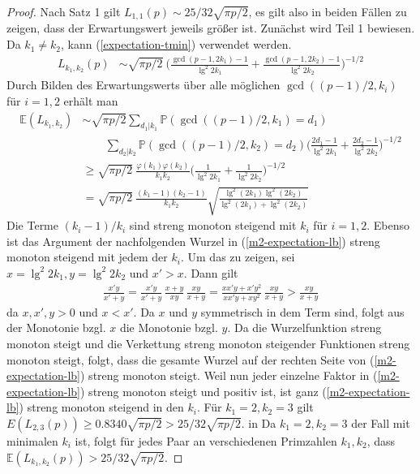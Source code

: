 \documentclass[a4paper, 10pt, ngerman]{article}
\newcommand{\E}{\mathbb{E}}
\renewcommand{\P}{\mathbb{P}}
\begin{document}
\begin{proof}
    Nach Satz 1 gilt $L_{1, 1}(p) \sim 25/32 \sqrt{\pi p /2}$, es gilt also in beiden Fällen zu zeigen, dass der Erwartungswert jeweils größer ist. Zunächst wird Teil 1 bewiesen. Da $k_1 \ne k_2$, kann (\ref{expectation-tmin}) verwendet werden.
    \begin{align*}
        L_{k_1, k_2}(p)
         & \sim \sqrt{\pi p / 2} \
        \Bigg ( \frac {\gcd(p - 1, 2k_1) - 1} {\lg^2 2k_1} +
        \frac {\gcd(p -1, 2k_2) - 1} {\lg^2 2k_2} \Bigg )^{-1/2}
    \end{align*}
    Durch Bilden des Erwartungswerts über alle möglichen $\gcd((p - 1)/2, k_i)$ für $i = 1, 2$ erhält man
    \begin{align}
        \E(L_{k_1, k_2})
         & \sim \sqrt{\pi p / 2}
        \sum_{d_1 | k_1} \P(\gcd((p - 1)/2, k_1) = d_1)
        \nonumber                                                 \\
         & \qquad \sum_{d_2 | k_2} \P(\gcd((p - 1)/2, k_2) = d_2)
        \Bigg ( \frac {2d_1 - 1} {\lg^2 2k_1}
        + \frac {2d_2 - 1} {\lg^2 2k_2} \Bigg )^{-1/2}
        \nonumber                                                 \\
         & \ge \sqrt{\pi p / 2} \
        \frac {\varphi(k_1) \varphi(k_2)} {k_1k_2}
        \Bigg (\frac 1 {\lg^2 2k_1} + \frac 1 {\lg^2 2k_2} \Bigg )^{-1/2}
        \nonumber                                                 \\
         & = \sqrt{\pi p / 2} \
        \frac {(k_1 - 1) (k_2- 1)} {k_1k_2}
        \sqrt{\frac{\lg^2(2k_1) \lg^2(2k_2)}{\lg^2(2k_1) + \lg^2(2k_2)}}
        \label{m2-expectation-lb}
    \end{align}
    Die Terme $(k_i - 1)/k_i$ sind streng monoton steigend mit $k_i$ für $i = 1, 2$. Ebenso ist das Argument der nachfolgenden Wurzel in (\ref{m2-expectation-lb}) streng monoton steigend mit jedem der $k_i$. Um das zu zeigen, sei $x = \lg^2 2k_1, y = \lg^2 2k_2$ und $x' > x$. Dann gilt
    \begin{align*}
        \frac {x'y} {x' + y}
        = \frac {x'y} {x' + y} \, \frac {x + y} {xy} \, \frac {xy} {x + y}
        = \frac {xx'y + x'y^2} {xx'y + xy^2} \, \frac {xy} {x + y}
        > \frac {xy} {x + y}
    \end{align*}
    da $x, x', y > 0$ und $x < x'$. Da $x$ und $y$ symmetrisch in dem Term sind, folgt aus der Monotonie bzgl. $x$ die Monotonie bzgl. $y$. Da die Wurzelfunktion streng monoton steigt und die Verkettung streng monoton steigender Funktionen streng monoton steigt, folgt, dass die gesamte Wurzel auf der rechten Seite von (\ref{m2-expectation-lb}) streng monoton steigt. Weil nun jeder einzelne Faktor in (\ref{m2-expectation-lb}) streng monoton steigt und positiv ist, ist ganz (\ref{m2-expectation-lb}) streng monoton steigend in den $k_i$. Für $k_1 = 2, k_2 = 3$ gilt $E(L_{2, 3}(p)) \ge 0.8340 \sqrt{\pi p /2}  > 25 / 32 \sqrt{\pi p / 2}$. in Da $k_1 = 2, k_2 = 3$ der Fall mit minimalen $k_i$ ist, folgt für jedes Paar an verschiedenen Primzahlen $k_1, k_2$, dass $\E(L_{k_1, k_2}(p)) > 25 / 32 \sqrt{\pi p / 2}$.


\end{proof}
\end{document}
